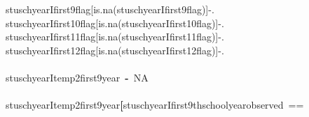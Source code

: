 \documentclass[12pt]{article}
\makeatletter
\newcommand{\hlnumber}[1]{\textcolor[rgb]{0,0,0}{#1}}%
\newcommand{\hlkeyword}[1]{\textcolor[rgb]{0,0,0}{\textbf{#1}}}%
\newcommand{\hlcomment}[1]{\textcolor[rgb]{0.180392156862745,0.6,0.341176470588235}{#1}}%
\newcommand{\hlassignement}[1]{\textcolor[rgb]{0,0,0}{\textbf{#1}}}%
\newcommand{\hlsymbol}[1]{\textcolor[rgb]{0,0,0}{#1}}%
\newcommand{\hlstd}[1]{\textcolor[rgb]{0,0,0}{#1}}%
\newenvironment{kframe}{%
 \def\FrameCommand##1{\hskip\@totalleftmargin \hskip-\fboxsep
 \colorbox{shadecolor}{##1}\hskip-\fboxsep
     \hskip-\linewidth \hskip-\@totalleftmargin \hskip\columnwidth}%
 \MakeFramed {\advance\hsize-\width
   \@totalleftmargin\z@ \linewidth\hsize
   \@setminipage}}%
 {\par\unskip\endMakeFramed}
\newenvironment{knitrout}{}{} %
\renewenvironment{knitrout}{\begin{footnotesize}}{\end{footnotesize}}
\makeatother
\begin{document}
\begin{knitrout}
\color{fgcolor}\begin{kframe}
\begin{flushleft}
\ttfamily\noindent
\hlcomment{\usebox{\hlnormalsizeboxhash}{\ }stuschyearI\usebox{\hlnormalsizeboxdollar}first9\usebox{\hlnormalsizeboxunderscore}flag[is.na(stuschyearI\usebox{\hlnormalsizeboxdollar}first9\usebox{\hlnormalsizeboxunderscore}flag)]\usebox{\hlnormalsizeboxlessthan}-\usebox{\hlnormalsizeboxsinglequote}.\usebox{\hlnormalsizeboxsinglequote}}\hspace*{\fill}\\
\hlstd{}\hlcomment{\usebox{\hlnormalsizeboxhash}{\ }stuschyearI\usebox{\hlnormalsizeboxdollar}first10\usebox{\hlnormalsizeboxunderscore}flag[is.na(stuschyearI\usebox{\hlnormalsizeboxdollar}first10\usebox{\hlnormalsizeboxunderscore}flag)]\usebox{\hlnormalsizeboxlessthan}-\usebox{\hlnormalsizeboxsinglequote}.\usebox{\hlnormalsizeboxsinglequote}}\hspace*{\fill}\\
\hlstd{}\hlcomment{\usebox{\hlnormalsizeboxhash}{\ }stuschyearI\usebox{\hlnormalsizeboxdollar}first11\usebox{\hlnormalsizeboxunderscore}flag[is.na(stuschyearI\usebox{\hlnormalsizeboxdollar}first11\usebox{\hlnormalsizeboxunderscore}flag)]\usebox{\hlnormalsizeboxlessthan}-\usebox{\hlnormalsizeboxsinglequote}.\usebox{\hlnormalsizeboxsinglequote}}\hspace*{\fill}\\
\hlstd{}\hlcomment{\usebox{\hlnormalsizeboxhash}{\ }stuschyearI\usebox{\hlnormalsizeboxdollar}first12\usebox{\hlnormalsizeboxunderscore}flag[is.na(stuschyearI\usebox{\hlnormalsizeboxdollar}first12\usebox{\hlnormalsizeboxunderscore}flag)]\usebox{\hlnormalsizeboxlessthan}-\usebox{\hlnormalsizeboxsinglequote}.\usebox{\hlnormalsizeboxsinglequote}}\hspace*{\fill}\\
\hlstd{}\hspace*{\fill}\\
\hlstd{}\hlsymbol{stuschyearI}\hlkeyword{\usebox{\hlnormalsizeboxdollar}}\hlsymbol{temp2\usebox{\hlnormalsizeboxunderscore}first9year}{\ }\hlassignement{\usebox{\hlnormalsizeboxlessthan}-}{\ }\hlnumber{NA}\hspace*{\fill}\\
\hlstd{}\hspace*{\fill}\\
\hlstd{}\hlsymbol{stuschyearI}\hlkeyword{\usebox{\hlnormalsizeboxdollar}}\hlsymbol{temp2\usebox{\hlnormalsizeboxunderscore}first9year}\hlkeyword{[}\hlsymbol{stuschyearI}\hlkeyword{\usebox{\hlnormalsizeboxdollar}}\hlsymbol{first9thschoolyear\usebox{\hlnormalsizeboxunderscore}observed}{\ }==\hspace*{\fill}\\

\end{flushleft}
\end{kframe}
\end{knitrout}
\end{document}
